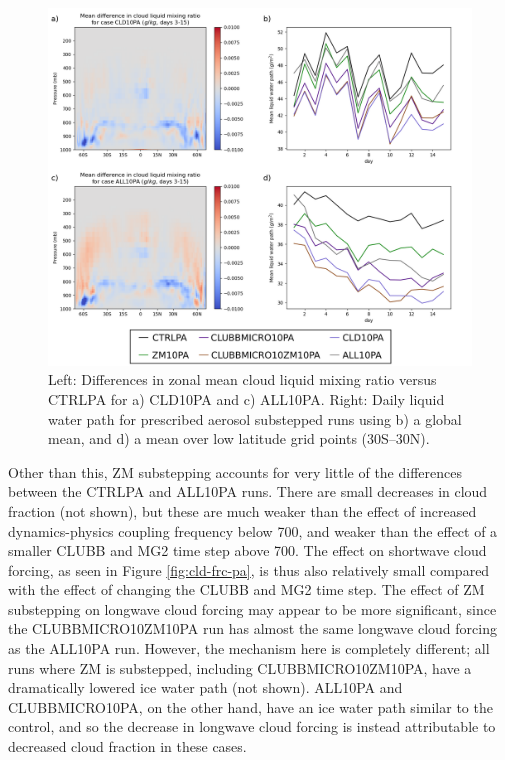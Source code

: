 \documentclass [11pt, proquest] {uwthesis}[2020/02/24]
\begin{document}
\begin{figure}
    \centering
    \includegraphics[width=5.5in]{Figure14.png}
    \caption{Left: Differences in zonal mean cloud liquid mixing ratio versus CTRLPA for a) CLD10PA and c) ALL10PA. Right: Daily liquid water path for prescribed aerosol substepped runs using b) a global mean, and d) a mean over low latitude grid points (\num{30}S--\num{30}N).}
    \label{fig:cldliq-pa}
\end{figure}

Other than this, ZM substepping accounts for very little of the differences between the CTRLPA and ALL10PA runs. There are small decreases in cloud fraction (not shown), but these are much weaker than the effect of increased dynamics-physics coupling frequency below \SI{700}{\millibar}, and weaker than the effect of a smaller CLUBB and MG2 time step above \SI{700}{\millibar}. The effect on shortwave cloud forcing, as seen in Figure \ref{fig:cld-frc-pa}, is thus also relatively small compared with the effect of changing the CLUBB and MG2 time step. The effect of ZM substepping on longwave cloud forcing may appear to be more significant, since the CLUBBMICRO10ZM10PA run has almost the same longwave cloud forcing as the ALL10PA run. However, the mechanism here is completely different; all runs where ZM is substepped, including CLUBBMICRO10ZM10PA, have a dramatically lowered ice water path (not shown). ALL10PA and CLUBBMICRO10PA, on the other hand, have an ice water path similar to the control, and so the decrease in longwave cloud forcing is instead attributable to decreased cloud fraction in these cases.
\end{document}
